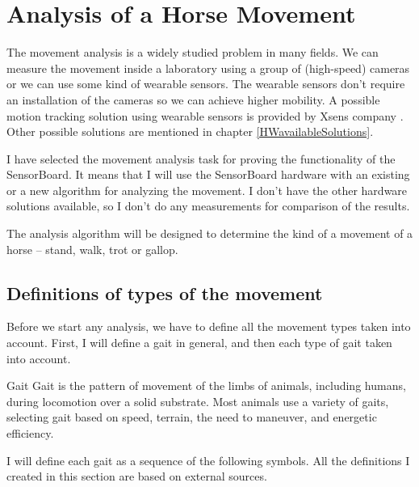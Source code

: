 \chapter{Analysis of a Horse Movement}
\label{HorseAnalysis}
The movement analysis is a widely studied problem in many fields. We can measure the movement inside a laboratory using a group of (high-speed) cameras or we can use some kind of wearable sensors. The wearable sensors don't require an installation of the cameras so we can achieve higher mobility. A possible motion tracking solution using wearable sensors is provided by Xsens company \cite{Xsens:MVN}. Other possible solutions are mentioned in chapter \ref{HWavailableSolutions}.

I have selected the movement analysis task for proving the functionality of the SensorBoard. It means that I will use the SensorBoard hardware with an existing or a new algorithm for analyzing the movement. I don't have the other hardware solutions available, so I don't do any measurements for comparison of the results.

The analysis algorithm will be designed to determine the kind of a movement of a horse -- stand, walk, trot or gallop.

\section{Definitions of types of the movement}
\label{definitionsOfGaits}
Before we start any analysis, we have to define all the movement types taken into account. First, I will define a gait in general, and then each type of gait taken into account.

\begin{definition}{Gait}
    \label{def:gait}
    Gait is the pattern of movement of the limbs of animals, including humans, during locomotion over a solid substrate. Most animals use a variety of gaits, selecting gait based on speed, terrain, the need to maneuver, and energetic efficiency. \cite{Higgins2009}
\end{definition}

I will define each gait as a sequence of the following symbols. All the definitions I created in this section are based on external sources. \cite{Duruttya2005} \cite{Higgins2009} \cite{Harrisc1993}

